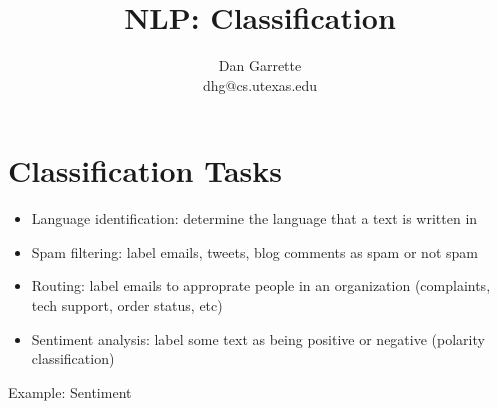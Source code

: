 \documentclass[11pt,letterpaper]{article}
\title{NLP: Classification}
\author{Dan Garrette\\\small{dhg@cs.utexas.edu}}
\begin{document}
\maketitle



\section{Classification Tasks}

\begin{itemize}
  \item Language identification: determine the language that a text is written in
  \item Spam filtering: label emails, tweets, blog comments as spam or not spam
  \item Routing: label emails to approprate people in an organization (complaints, tech support, order status, etc)
  \item Sentiment analysis: label some text as being positive or negative (polarity classification)
\end{itemize}

Example: Sentiment
\end{document}
